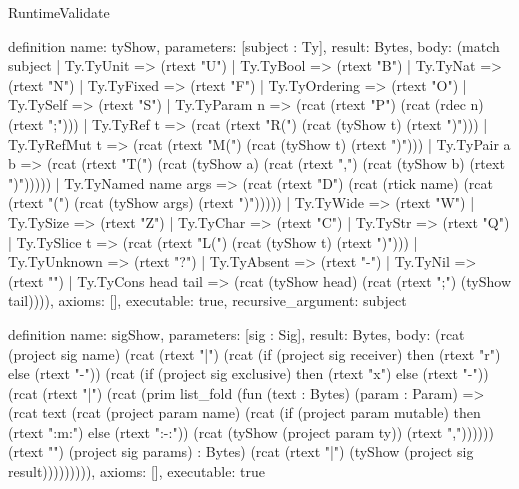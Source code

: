 \begin{lexlean}{RuntimeValidate}
\begin{semanticmodule}
definition{
  name: tyShow,
  parameters: [subject : Ty],
  result: Bytes,
  body: (match subject
    | Ty.TyUnit => (rtext "U")
    | Ty.TyBool => (rtext "B")
    | Ty.TyNat => (rtext "N")
    | Ty.TyFixed => (rtext "F")
    | Ty.TyOrdering => (rtext "O")
    | Ty.TySelf => (rtext "S")
    | Ty.TyParam n => (rcat (rtext "P") (rcat (rdec n) (rtext ";")))
    | Ty.TyRef t => (rcat (rtext "R(") (rcat (tyShow t) (rtext ")")))
    | Ty.TyRefMut t => (rcat (rtext "M(") (rcat (tyShow t) (rtext ")")))
    | Ty.TyPair a b => (rcat (rtext "T(") (rcat (tyShow a) (rcat (rtext ",") (rcat (tyShow b) (rtext ")")))))
    | Ty.TyNamed name args => (rcat (rtext "D") (rcat (rtick name) (rcat (rtext "(") (rcat (tyShow args) (rtext ")")))))
    | Ty.TyWide => (rtext "W")
    | Ty.TySize => (rtext "Z")
    | Ty.TyChar => (rtext "C")
    | Ty.TyStr => (rtext "Q")
    | Ty.TySlice t => (rcat (rtext "L(") (rcat (tyShow t) (rtext ")")))
    | Ty.TyUnknown => (rtext "?")
    | Ty.TyAbsent => (rtext "-")
    | Ty.TyNil => (rtext "")
    | Ty.TyCons head tail => (rcat (tyShow head) (rcat (rtext ";") (tyShow tail)))),
  axioms: [],
  executable: true,
  recursive_argument: subject
}

definition{
  name: sigShow,
  parameters: [sig : Sig],
  result: Bytes,
  body: (rcat (project sig name) (rcat (rtext "|") (rcat (if (project sig receiver) then (rtext "r") else (rtext "-")) (rcat (if (project sig exclusive) then (rtext "x") else (rtext "-")) (rcat (rtext "|") (rcat (prim list_fold (fun (text : Bytes) (param : Param) => (rcat text (rcat (project param name) (rcat (if (project param mutable) then (rtext ":m:") else (rtext ":-:")) (rcat (tyShow (project param ty)) (rtext ",")))))) (rtext "") (project sig params) : Bytes) (rcat (rtext "|") (tyShow (project sig result))))))))),
  axioms: [],
  executable: true
}


\end{semanticmodule}
\end{lexlean}

